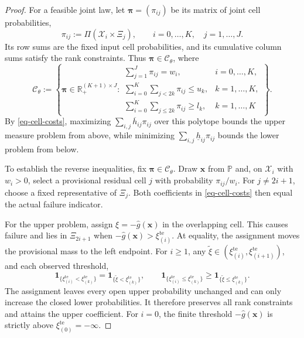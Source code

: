 \documentclass[review,11pt,3p,authoryear,nopreprintline]{elsarticle}
\begin{document}
\begin{proof}
  For a feasible joint law, let $\bm\pi=(\pi_{ij})$ be its matrix of joint cell probabilities,
  \begin{equation*}
    \pi_{ij}:=\Pi(\mathcal X_i\times\Xi_j),
    \qquad i=0,\ldots,K,\quad j=1,\ldots,J.
  \end{equation*}
  Its row sums are the fixed input cell probabilities, and its cumulative column sums satisfy the rank constraints. Thus $\bm\pi\in\mathcal C_\theta$, where
  \begin{equation}
    \mathcal C_\theta:=
    \left\{\bm\pi\in\mathbb R_+^{(K+1)\times J}:
    \begin{array}{ll}
      \displaystyle\sum_{j=1}^J\pi_{ij}=w_i,
        &i=0,\ldots,K,\\[1mm]
      \displaystyle\sum_{i=0}^K\sum_{j<2k}\pi_{ij}\le u_k,
        &k=1,\ldots,K,\\[1mm]
      \displaystyle\sum_{i=0}^K\sum_{j\le2k}\pi_{ij}\ge l_k,
        &k=1,\ldots,K
    \end{array}\right\}.
    \label{eq-cell-mass-polytope}
  \end{equation}
  By \eqref{eq-cell-costs}, maximizing $\sum_{i,j}\overline h_{ij}\pi_{ij}$ over this polytope bounds the upper measure problem from above, while minimizing $\sum_{i,j}\underline h_{ij}\pi_{ij}$ bounds the lower problem from below.

  To establish the reverse inequalities, fix $\bm\pi\in\mathcal C_\theta$. Draw $\bm x$ from $\mathbb P$ and, on $\mathcal X_i$ with $w_i>0$, select a provisional residual cell $j$ with probability $\pi_{ij}/w_i$. For $j\ne2i+1$, choose a fixed representative of $\Xi_j$. Both coefficients in \eqref{eq-cell-costs} then equal the actual failure indicator.

  For the upper problem, assign $\xi=-\hat g(\bm x)$ in the overlapping cell. This causes failure and lies in $\Xi_{2i+1}$ when $-\hat g(\bm x)>\xi_{(i)}^{\mathrm{te}}$. At equality, the assignment moves the provisional mass to the left endpoint. For $i\ge1$, any $\widetilde\xi\in\left(\xi_{(i)}^{\mathrm{te}},\xi_{(i+1)}^{\mathrm{te}}\right)$, and each observed threshold,
  \begin{equation*}
    \mathbf1_{\{\xi_{(i)}^{\mathrm{te}}<\xi_{(k)}^{\mathrm{te}}\}}=\mathbf1_{\{\widetilde\xi<\xi_{(k)}^{\mathrm{te}}\}},\qquad
    \mathbf1_{\{\xi_{(i)}^{\mathrm{te}}\le \xi_{(k)}^{\mathrm{te}}\}}\ge\mathbf1_{\{\widetilde\xi\le \xi_{(k)}^{\mathrm{te}}\}}.
  \end{equation*}
  The assignment leaves every open upper probability unchanged and can only increase the closed lower probabilities. It therefore preserves all rank constraints and attains the upper coefficient. For $i=0$, the finite threshold $-\hat g(\bm x)$ is strictly above $\xi_{(0)}^{\mathrm{te}}=-\infty$.


\end{proof}
\end{document}
